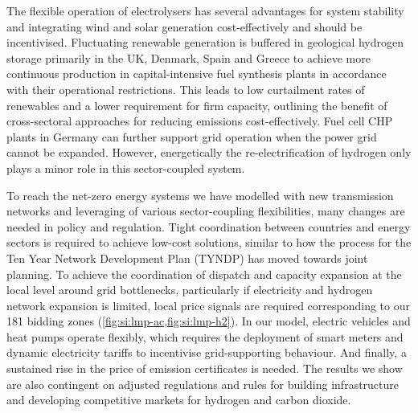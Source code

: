 The flexible operation of electrolysers has several advantages for system
stability and integrating wind and solar generation cost-effectively and should
be incentivised. Fluctuating renewable generation is buffered in geological
hydrogen storage primarily in the UK, Denmark, Spain and Greece to achieve more
continuous production in capital-intensive fuel synthesis plants in accordance
with their operational restrictions. This leads to low curtailment rates of
renewables and a lower requirement for firm capacity, outlining the benefit of
cross-sectoral approaches for reducing \co emissions cost-effectively. Fuel cell
CHP plants in Germany can further support grid operation when the power grid
cannot be expanded. However, energetically the re-electrification of hydrogen
only plays a minor role in this sector-coupled system.

To reach the net-zero energy systems we have modelled with new transmission
networks and leveraging of various sector-coupling flexibilities, many changes
are needed in policy and regulation. Tight coordination between countries and
energy sectors is required to achieve low-cost solutions, similar to how the
process for the Ten Year Network Development Plan (TYNDP) has moved towards
joint planning.\cite{entso-eTYNDP20222022} To achieve the coordination of
dispatch and capacity expansion at the local level around grid bottlenecks,
particularly if electricity and hydrogen network expansion is limited, local
price signals are required corresponding to our 181 bidding zones
(\cref{fig:si:lmp-ac,fig:si:lmp-h2}). In our model, electric vehicles and heat
pumps operate flexibly, which requires the deployment of smart meters and
dynamic electricity tariffs to incentivise grid-supporting   behaviour. And
finally, a sustained rise in the price of \co emission certificates is needed.
The results we show are also contingent on adjusted regulations and rules for
building infrastructure and developing competitive markets for hydrogen and
carbon dioxide.
